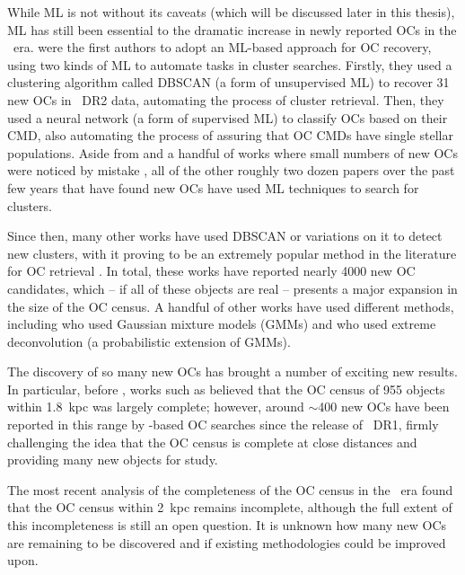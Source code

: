 While ML is not without its caveats (which will be discussed later in this thesis), ML has still been essential to the dramatic increase in newly reported OCs in the \gaia\ era. \cite{castro-ginard_new_2018} were the first authors to adopt an ML-based approach for OC recovery, using two kinds of ML to automate tasks in cluster searches. Firstly, they used a clustering algorithm called DBSCAN (a form of unsupervised ML) to recover 31 new OCs in \gaia\ DR2 data, automating the process of cluster retrieval. Then, they used a neural network (a form of supervised ML) to classify OCs based on their CMD, also automating the process of assuring that OC CMDs have single stellar populations. Aside from \cite{sim_207_2019} and a handful of works where small numbers of new OCs were noticed by mistake \citep[e.g.][]{zari_3d_2018,bastian_gaia_2019,anders_ngc_2022-1}, all of the other roughly two dozen papers over the past few years that have found new OCs have used ML techniques to search for clusters.

Since then, many other works have used DBSCAN or variations on it to detect new clusters, with it proving to be an extremely popular method in the literature for OC retrieval \citep{castro-ginard_hunting_2019,castro-ginard_hunting_2020,castro-ginard_hunting_2022,liu_catalog_2019,he_catalogue_2021,he_new_2022,he_unveiling_hidden_2022,he_blind_allsky_2022,qin_discovery_2021,hao_sixteen_2020,hao_newly_2022,qin_hunting_2023}. In total, these works have reported nearly 4000 new OC candidates, which -- if all of these objects are real -- presents a major expansion in the size of the OC census. A handful of other works have used different methods, including \cite{cantat-gaudin_gaia_2019} who used Gaussian mixture models (GMMs) and \cite{jaehnig_membership_2021} who used extreme deconvolution (a probabilistic extension of GMMs).

The discovery of so many new OCs has brought a number of exciting new results. In particular, before \gaia, works such as \cite{kharchenko_global_2013} believed that the OC census of 955 objects within 1.8~kpc was largely complete; however, around $\sim$400 new OCs have been reported in this range by \gaia-based OC searches since the release of \gaia\ DR1, firmly challenging the idea that the OC census is complete at close distances and providing many new objects for study.

The most recent analysis of the completeness of the OC census in the \gaia\ era \citep{anders_milky_2020} found that the OC census within 2~kpc remains incomplete, although the full extent of this incompleteness is still an open question. It is unknown how many new OCs are remaining to be discovered and if existing methodologies could be improved upon.


